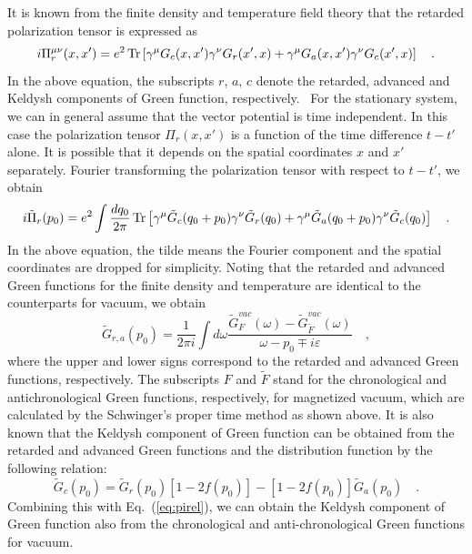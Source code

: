 It is known from the finite density and temperature field theory that the
retarded polarization tensor is expressed as
\begin{equation}
i \Pi_{r}^{\mu\nu}(x, x') = e^{2}\,{\rm Tr} \left [\gamma ^{\mu} G_{c}(x, x')
\gamma^{\nu}
G_{r}(x', x) + \gamma ^{\mu} G_{a}(x, x') \gamma^{\nu} G_{c}(x', x) \right ]
\quad .
\label{eq:pir}
\end{equation}
In the above equation, the subscripts $r$, $a$, $c$ denote the retarded,
advanced and Keldysh components of Green function, 
respectively.~\cite{ch} For the stationary system, we can in general 
assume that the vector potential is time independent. In
this case the polarization tensor $\Pi_{r}(x, x')$ is a function of the time
difference $t - t'$ alone. It is possible that it depends on the spatial
coordinates
{\boldmath $x$} and {\boldmath $x'$} separately. Fourier transforming the
polarization tensor with respect to $t - t'$, we obtain
\begin{equation}
i\tilde{\Pi}_{r}(p_{0}) = e^{2}\int \frac{dq_{0}}{2\pi} \,{\rm Tr} \left [
\gamma ^{\mu} \tilde{G}_{c}(q_{0} + p_{0}) \gamma ^{\nu}
\tilde{G}_{r}(q_{0})
+ \gamma ^{\mu} \tilde{G}_{a}(q_{0} + p_{0}) \gamma ^{\nu}
\tilde{G}_{c}(q_{0})
\right ] \quad .
\label{eq:fourier}
\end{equation}
In the above equation, the tilde means the Fourier component and the spatial
coordinates are dropped for simplicity. Noting that the retarded and
advanced Green functions for the finite density and temperature are 
identical to the counterparts for vacuum, we obtain
\begin{equation}
\tilde{G}_{r,a}(p_{0}) = \frac{1}{2\pi i} \int d \omega
\frac{\tilde{G}^{vac}_{F}(\omega) - \tilde{G}^{vac}_{\tilde{F}}(\omega)}
{\omega - p_{0} \mp i \varepsilon} \quad ,
\label{eq:pirel}
\end{equation}
where the upper and lower signs correspond to the retarded and advanced
Green functions, respectively. The subscripts $F$ and $\tilde{F}$ stand for
the chronological and antichronological Green functions, respectively, for
magnetized vacuum, which are calculated by the Schwinger's proper time
method as shown above. It is also known that the Keldysh component of Green
function can be obtained from the retarded and advanced Green functions and
the distribution function by the following relation:
\begin{equation}
\tilde{G}_{c}(p_{0}) = \tilde{G}_{r}(p_{0}) [1 - 2f(p_{0})] -
[1 - 2 f(p_{0})] \tilde{G}_{a}(p_{0}) \quad .
\label{eq:gkeldysh}
\end{equation}
Combining this with Eq.~(\ref{eq:pirel}), we can obtain the Keldysh
component
of Green function also from the chronological and anti-chronological Green
functions
for vacuum.

